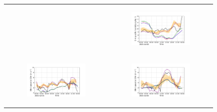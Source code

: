 \begin{figure}[hbtp]
\begin{tabular}{cc}
\begin{subfigure}[t]{0.5\textwidth}
        \end{subfigure} &
        \begin{subfigure}[t]{0.5\textwidth}
            \caption{}
            \includegraphics[width=\textwidth]{images/chap5/IOP_TS/TS_2021-07-20_elsplans_q2m.png}
        \end{subfigure} \\
        \begin{subfigure}[t]{0.5\textwidth}
            \caption{}
            \includegraphics[width=\textwidth]{images/chap5/IOP_TS/TS_2021-07-15_elsplans_wind_speed_10m.png}
        \end{subfigure} &
        \begin{subfigure}[t]{0.5\textwidth}
            \caption{}
            \includegraphics[width=\textwidth]{images/chap5/IOP_TS/TS_2021-07-20_elsplans_wind_speed_10m.png}

\end{subfigure}
\end{tabular}
\end{figure}
